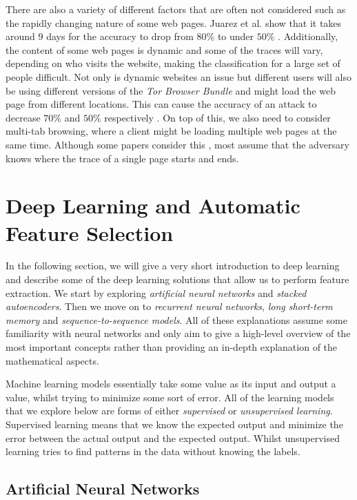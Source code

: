 There are also a variety of different factors that are often not considered such as the rapidly changing nature of some web pages.
Juarez et al. show that it takes around $9$ days for the accuracy to drop from $80\%$ to under $50\%$ \cite{wfpevaluation}.
Additionally, the content of some web pages is dynamic and some of the traces will vary, depending on who visits the website, making the classification for a large set of people difficult.
Not only is dynamic websites an issue but different users will also be using different versions of the \textit{Tor Browser Bundle} and might load the web page from different locations.
This can cause the accuracy of an attack to decrease $70\%$ and $50\%$ respectively \cite{wfpevaluation}.
On top of this, we also need to consider multi-tab browsing, where a client might be loading multiple web pages at the same time.
Although some papers consider this \cite{naivebayes}, most assume that the adversary knows where the trace of a single page starts and ends.

\section{Deep Learning and Automatic Feature Selection}

In the following section, we will give a very short introduction to deep learning and describe some of the deep learning solutions that allow us to perform feature extraction.
We start by exploring \textit{artificial neural networks} and \textit{stacked autoencoders}.
Then we move on to \textit{recurrent neural networks}, \textit{long short-term memory} and \textit{sequence-to-sequence models}.
All of these explanations assume some familiarity with neural networks and only aim to give a high-level overview of the most important concepts rather than providing an in-depth explanation of the mathematical aspects.

Machine learning models essentially take some value as its input and output a value, whilst trying to minimize some sort of error.
All of the learning models that we explore below are forms of either \textit{supervised} or \textit{unsupervised learning}.
Supervised learning means that we know the expected output and minimize the error between the actual output and the expected output.
Whilst unsupervised learning tries to find patterns in the data without knowing the labels.

\subsection{Artificial Neural Networks}


